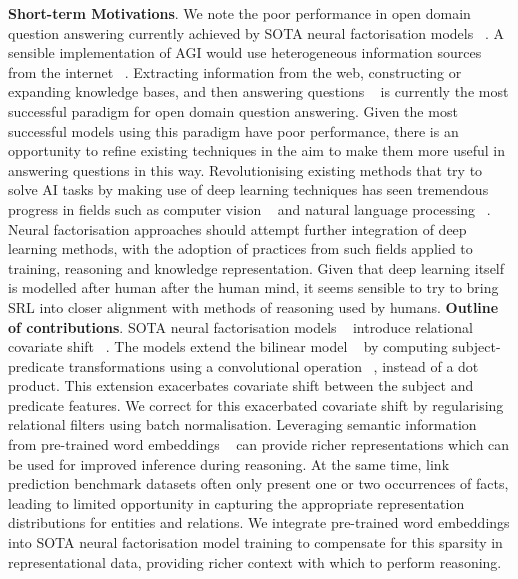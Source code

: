 \textbf{Short-term Motivations}. We note the poor performance in open domain question answering currently achieved by SOTA neural factorisation models ~\citep{balazevic2019hypernetwork, dettmers2018convolutional}. A sensible implementation of AGI would use heterogeneous information sources from the internet ~\citep{angeli2013philosophers}. Extracting information from the web, constructing or expanding knowledge bases, and then answering questions ~\citep{shalaby2019beyond} is currently the most successful paradigm for open domain question answering. Given the most successful models using this paradigm have poor performance, there is an opportunity to refine existing techniques in the aim to make them more useful in answering questions in this way. Revolutionising existing methods that try to solve AI tasks by making use of deep learning techniques has seen tremendous progress in fields such as computer vision ~\citep{hudson2018compositional}  and natural language processing ~\citep{peters2018deep}. Neural factorisation approaches should attempt further integration of deep learning methods, with the adoption of practices from such fields applied to training, reasoning and knowledge representation. Given that deep learning itself is modelled after human after the human mind, it seems sensible to try to bring SRL into closer alignment with methods of reasoning used by humans. \newline
\textbf{Outline of contributions}. SOTA neural factorisation models ~\citep{balazevic2019hypernetwork, dettmers2018convolutional} introduce relational covariate shift ~\citep{ioffe2015batch}. The models extend the bilinear model ~\citep{jenatton2012latent} by computing subject-predicate transformations using a convolutional operation ~\citep{zeiler2014visualizing}, instead of a dot product. This extension exacerbates covariate shift between the subject and predicate features. We correct for this exacerbated covariate shift by regularising relational filters using batch normalisation. \newline 
Leveraging semantic information ~\citep{NIPS2013_5028} from pre-trained word embeddings ~\citep{mikolov2013distributed} can provide richer representations which can be used for improved inference during reasoning. At the same time, link prediction benchmark datasets often only present one or two occurrences of facts, leading to limited opportunity in capturing the appropriate representation distributions for entities and relations. We integrate pre-trained word embeddings into SOTA neural factorisation model training to compensate for this sparsity in representational data, providing richer context with which to perform reasoning.

